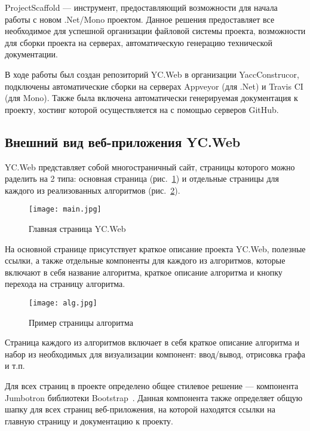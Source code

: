\documentclass[14pt]{matmex-diploma-custom}
\begin{document}
ProjectScaffold --- инструмент, предоставляющий возможности для начала работы с новом .Net/Mono проектом. Данное решения предоставляет все необходимое для успешной организации файловой системы проекта, возможности для сборки проекта на серверах, автоматическую генерацию технической документации.

В ходе работы был создан репозиторий YC.Web в организации \linebreak YaccConstrucor, подключены автоматические сборки на серверах \linebreak Appveyor (для .Net) и Travis CI (для Mono). Также была включена автоматически генерируемая документация к проекту, хостинг которой осуществляется на с помощью серверов GitHub.

\subsection{Внешний вид веб-приложения YC.Web}

YC.Web представляет собой многостраничный сайт, страницы которого можно раделить на 2 типа: основная страница (рис.~\ref{pic1}) и отдельные страницы для каждого из реализованных алгоритмов (рис.~\ref{pic2}).

\begin{figure}[h]
\centering
\texttt{[image: main.jpg]}
\caption{Главная страница YC.Web}
\label{pic1}
\end{figure}

\newpage
На основной странице присутствует краткое описание проекта \linebreak YC.Web, полезные ссылки, а также отдельные компоненты для каждого из алгоритмов, которые включают в себя название алгоритма, краткое описание алгоритма и кнопку перехода на страницу алгоритма.

\begin{figure}[h]
\centering
\texttt{[image: alg.jpg]}
\caption{Пример страницы алгоритма}
\label{pic2}
\end{figure}

\newpage

Страница каждого из алгоритмов включает в себя краткое описание алгоритма и набор из необходимых для визуализации компонент: ввод/вывод, отрисовка графа и т.п.	

Для всех страниц в проекте определено общее стилевое решение --- компонента Jumbotron библиотеки Bootstrap~\cite{bootstrap}. Данная компонента также определяет общую шапку для всех страниц веб-приложения, на которой находятся ссылки на главную страницу и документацию к проекту.
\end{document}

